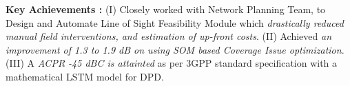 \textbf{Key Achievements :} (I) Closely worked with Network Planning Team, to Design and Automate Line of Sight Feasibility Module which \textit{drastically reduced manual field interventions, and estimation of up-front costs}. (II) Achieved \textit{an improvement of 1.3 to 1.9 dB on using SOM based Coverage Issue optimization}. (III) A \textit{ACPR -45 dBC is attainted} as per 3GPP standard specification with a mathematical LSTM model for DPD.

